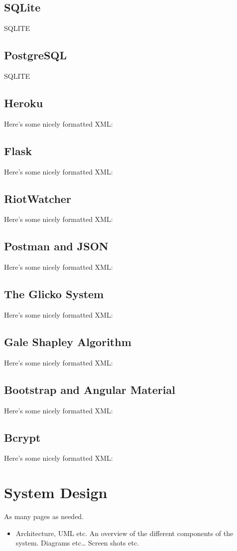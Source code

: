 \section{SQLite}
SQLITE
\section{PostgreSQL}
SQLITE
\section{Heroku}
Here's some nicely formatted XML:
\section{Flask}
Here's some nicely formatted XML:
\section{RiotWatcher}
Here's some nicely formatted XML:
\section{Postman and JSON}
Here's some nicely formatted XML:
\section{The Glicko System}
Here's some nicely formatted XML:
\section{Gale Shapley Algorithm}
Here's some nicely formatted XML:
\section{Bootstrap and Angular Material}
Here's some nicely formatted XML:
\section{Bcrypt}
Here's some nicely formatted XML:
\chapter{System Design}
As many pages as needed.
\begin{itemize}
	\item Architecture, UML etc. An overview of the different components of the system. Diagrams etc… Screen shots etc.
\end{itemize}

